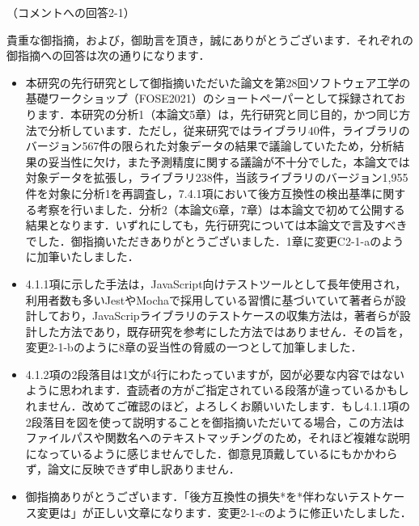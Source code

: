 \documentclass{jarticle} %
\def\subsection#1{ \vspace{1pc} {\gt #1} }
\begin{document}
\subsection{（コメントへの回答2-1）}

貴重な御指摘，および，御助言を頂き，誠にありがとうございます．それぞれの御指摘への回答は次の通りになります．
\begin{itemize}
    \item 本研究の先行研究として御指摘いただいた論文を第28回ソフトウェア工学の基礎ワークショップ（FOSE2021）のショートペーパーとして採録されております．本研究の分析1（本論文5章）は，先行研究と同じ目的，かつ同じ方法で分析しています．ただし，従来研究ではライブラリ40件，ライブラリのバージョン567件の限られた対象データの結果で議論していたため，分析結果の妥当性に欠け，また予測精度に関する議論が不十分でした，本論文では対象データを拡張し，ライブラリ238件，当該ライブラリのバージョン1,955件を対象に分析1を再調査し，7.4.1項において後方互換性の検出基準に関する考察を行いました．分析2（本論文6章，7章）は本論文で初めて公開する結果となります．いずれにしても，先行研究については本論文で言及すべきでした．御指摘いただきありがとうございました．1章に変更C2-1-aのように加筆いたしました．
    \item 4.1.1項に示した手法は，JavaScript向けテストツールとして長年使用され，利用者数も多いJestやMochaで採用している習慣に基づいていて著者らが設計しており，JavaScripライブラリのテストケースの収集方法は，著者らが設計した方法であり，既存研究を参考にした方法ではありません．その旨を，変更2-1-bのように8章の妥当性の脅威の一つとして加筆しました．
    \item 4.1.2項の2段落目は1文が4行にわたっていますが，図が必要な内容ではないように思われます．査読者の方がご指定されている段落が違っているかもしれません．改めてご確認のほど，よろしくお願いいたします．もし4.1.1項の2段落目を図を使って説明することを御指摘いただいてる場合，この方法はファイルパスや関数名へのテキストマッチングのため，それほど複雑な説明になっているように感じませんでした．御意見頂戴しているにもかかわらず，論文に反映できず申し訳ありません．
    \item 御指摘ありがとうございます．「後方互換性の損失*を*伴わないテストケース変更は」が正しい文章になります．変更2-1-cのように修正いたしました．
\end{itemize}
\end{document}

